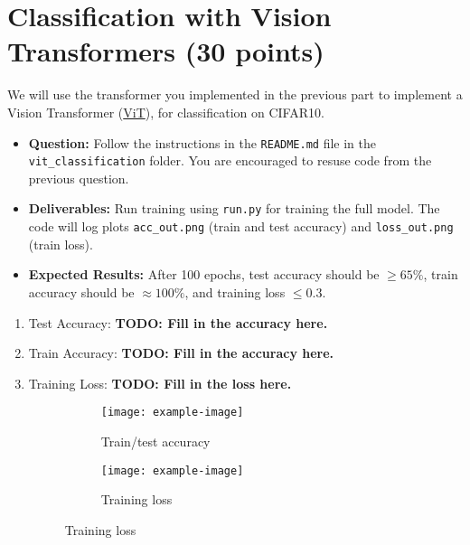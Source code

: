 \documentclass{article}
\begin{document}
\clearpage

\section{Classification with Vision Transformers (30 points)}

We will use the transformer you implemented in the previous part to implement a Vision Transformer (\href{https://arxiv.org/abs/2010.11929}{ViT}), for classification on CIFAR10. 

\begin{itemize}
    \item \textbf{Question:} Follow the instructions in the \texttt{README.md} file in the \texttt{vit\_classification} folder. You are encouraged to resuse code from the previous question. 
    \item \textbf{Deliverables:} Run training using \texttt{run.py} for training the full model. The code will log plots \texttt{acc\_out.png} (train and test accuracy) and \texttt{loss\_out.png} (train loss). 
    \item \textbf{Expected Results:} After 100 epochs, test accuracy should be $\geq 65\%$, train accuracy should be $\approx 100\%$, and training loss $\leq 0.3$. 
\end{itemize}




\begin{enumerate}
    \item Test Accuracy: \textbf{TODO: Fill in the accuracy here.}

    \item Train Accuracy: \textbf{TODO: Fill in the accuracy here.}

    \item Training Loss: \textbf{TODO: Fill in the loss here.}

    \begin{figure}[H]
    \centering
    \begin{subfigure}[b]{0.32\linewidth}
        \texttt{[image: example-image]}
        \caption{Train/test accuracy}
    \end{subfigure}
    \begin{subfigure}[b]{0.32\linewidth}
        \texttt{[image: example-image]}
        \caption{Training loss}
    \end{subfigure}
\end{figure}

\end{enumerate}


% 
% 
\end{document}
